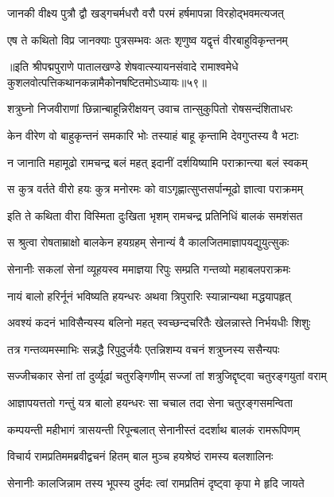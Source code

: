 \twolineshloka
{जानकी वीक्ष्य पुत्रौ द्वौ खड्गचर्मधरौ वरौ}
{परमं हर्षमापन्ना विरहोद्भवमत्यजत्}%

\twolineshloka
{एष ते कथितो विप्र जानक्याः पुत्रसम्भवः}
{अतः शृणुष्व यद्वृत्तं वीरबाहुविकृन्तनम्}%

॥इति श्रीपद्मपुराणे पातालखण्डे शेषवात्स्यायनसंवादे रामाश्वमेधे कुशलवोत्पत्तिकथानकन्नामैकोनषष्टितमोऽध्यायः॥५९॥



\twolineshloka
{शत्रुघ्नो निजवीराणां छिन्नान्बाहून्निरीक्षयन्}
{उवाच तान्सुकुपितो रोषसन्दंशिताधरः}%

\twolineshloka
{केन वीरेण वो बाहुकृन्तनं समकारि भोः}
{तस्याहं बाहू कृन्तामि देवगुप्तस्य वै भटाः}%

\twolineshloka
{न जानाति महामूढो रामचन्द्र बलं महत्}
{इदानीं दर्शयिष्यामि पराक्रान्त्या बलं स्वकम्}%

\twolineshloka
{स कुत्र वर्तते वीरो हयः कुत्र मनोरमः}
{को वाऽगृह्णात्सुप्तसर्पान्मूढो ज्ञात्वा पराक्रमम्}%

\twolineshloka
{इति ते कथिता वीरा विस्मिता दुःखिता भृशम्}
{रामचन्द्र प्रतिनिधिं बालकं समशंसत}%

\twolineshloka
{स श्रुत्वा रोषताम्राक्षो बालकेन हयग्रहम्}
{सेनान्यं वै कालजितमाज्ञापयद्युयुत्सुकः}%

\twolineshloka
{सेनानीः सकलां सेनां व्यूहयस्व ममाज्ञया}
{रिपुः सम्प्रति गन्तव्यो महाबलपराक्रमः}%

\twolineshloka
{नायं बालो हरिर्नूनं भविष्यति हयन्धरः}
{अथवा त्रिपुरारिः स्यान्नान्यथा मद्धयापहृत्}%

\twolineshloka
{अवश्यं कदनं भाविसैन्यस्य बलिनो महत्}
{स्वच्छन्दचरितैः खेलन्नास्ते निर्भयधीः शिशुः}%

\twolineshloka
{तत्र गन्तव्यमस्माभिः सन्नद्धै रिपुदुर्जयैः}
{एतन्निशम्य वचनं शत्रुघ्नस्य ससैन्यपः}%

\twolineshloka
{सज्जीचकार सेनां तां दुर्व्यूढां चतुरङ्गिणीम्}
{सज्जां तां शत्रुजिद्दृष्ट्वा चतुरङ्गयुतां वराम्}%

\twolineshloka
{आज्ञापयत्ततो गन्तुं यत्र बालो हयन्धरः}
{सा चचाल तदा सेना चतुरङ्गसमन्विता}%

\twolineshloka
{कम्पयन्ती महीभागं त्रासयन्ती रिपून्बलात्}
{सेनानीस्तं ददर्शाथ बालकं रामरूपिणम्}%

\twolineshloka
{विचार्य रामप्रतिममब्रवीद्वचनं हितम्}
{बाल मुञ्च हयश्रेष्ठं रामस्य बलशालिनः}%

\twolineshloka
{सेनानीः कालजिन्नाम तस्य भूपस्य दुर्मदः}
{त्वां रामप्रतिमं दृष्ट्वा कृपा मे हृदि जायते}%

